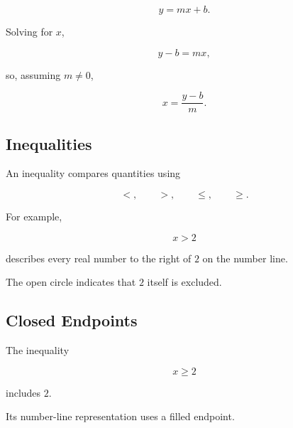 \[ y=mx+b. \]

Solving for \(x\),

\[ y-b=mx, \]

so, assuming \(m\neq0\),

\[ x=\frac{y-b}{m}. \]

\subsection{Inequalities}
\label{subsec:elementary-inequalities}

An inequality compares quantities using

\[ <,\qquad >,\qquad \leq,\qquad \geq. \]

For example,

\[ x>2 \]

describes every real number to the right of \(2\) on the number line.

\begin{center}
\end{center}

The open circle indicates that \(2\) itself is excluded.

\subsection{Closed Endpoints}
\label{subsec:closed-endpoints}

The inequality

\[ x\geq2 \]

includes \(2\).

Its number-line representation uses a filled endpoint.

\begin{center}
\end{center}

